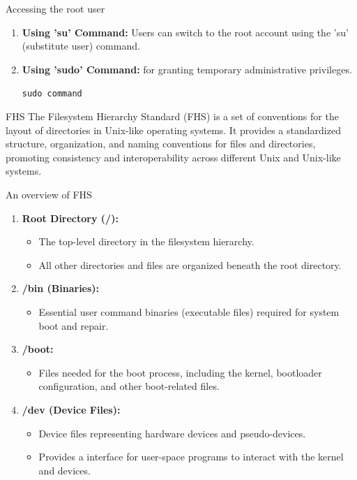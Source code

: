 \documentclass{beamer}
\begin{document}
\begin{frame}{Accessing the root user}
	\begin{enumerate}
		\item \textbf{Using 'su' Command:} Users can switch to the root account using the 'su' (substitute user) command.
		\item \textbf{Using 'sudo' Command:} for granting temporary administrative privileges.
			
			\texttt {sudo command}
	\end{enumerate}
\end{frame}

\begin{frame}{FHS}
	The Filesystem Hierarchy Standard (FHS) is a set of conventions for the layout of directories in Unix-like operating systems. It provides a standardized structure, organization, and naming conventions for files and directories, promoting consistency and interoperability across different Unix and Unix-like systems.
\end{frame}

\begin{frame}{An overview of FHS}
	\begin{enumerate}
		\item \textbf{Root Directory (/):} 
			\begin{itemize}
				\item The top-level directory in the filesystem hierarchy.
				\item All other directories and files are organized beneath the root directory.
			\end{itemize}
	\item {\textbf{/bin (Binaries):}}
			\begin{itemize}
				\item Essential user command binaries (executable files) required for system boot and repair.
			\end{itemize}
		\item {\textbf{/boot:}}
			\begin{itemize}
				\item Files needed for the boot process, including the kernel, bootloader configuration, and other boot-related files.
			\end{itemize}
		\item \textbf{/dev (Device Files):}
			\begin{itemize}
				\item Device files representing hardware devices and pseudo-devices.
				\item Provides a interface for user-space programs to interact with the kernel and devices.
			\end{itemize}
	\end{enumerate}
\end{frame}
\end{document}

